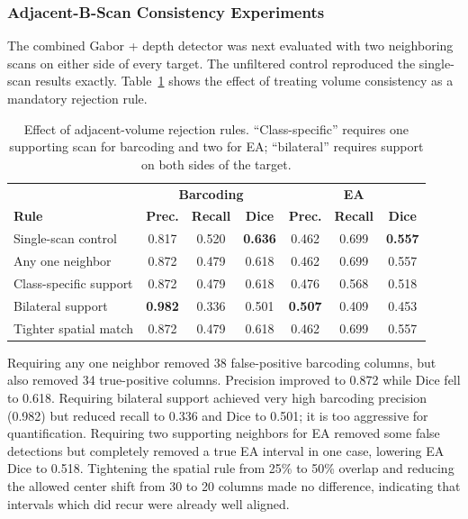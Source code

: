 \documentclass[11pt]{article}
\begin{document}
\subsubsection{Adjacent-B-Scan Consistency Experiments}

The combined Gabor + depth detector was next evaluated with two neighboring
scans on either side of every target.  The unfiltered control reproduced the
single-scan results exactly.  Table~\ref{tab:adjacent_experiments} shows the
effect of treating volume consistency as a mandatory rejection rule.

\begin{table}[H]
\centering
\small
\begin{tabular}{lccc|ccc}
\toprule
& \multicolumn{3}{c|}{\textbf{Barcoding}} &
\multicolumn{3}{c}{\textbf{EA}} \\
\textbf{Rule} & \textbf{Prec.} & \textbf{Recall} & \textbf{Dice} &
\textbf{Prec.} & \textbf{Recall} & \textbf{Dice} \\
\midrule
Single-scan control & 0.817 & 0.520 & \textbf{0.636} & 0.462 & 0.699 & \textbf{0.557} \\
Any one neighbor & 0.872 & 0.479 & 0.618 & 0.462 & 0.699 & 0.557 \\
Class-specific support & 0.872 & 0.479 & 0.618 & 0.476 & 0.568 & 0.518 \\
Bilateral support & \textbf{0.982} & 0.336 & 0.501 & \textbf{0.507} & 0.409 & 0.453 \\
Tighter spatial match & 0.872 & 0.479 & 0.618 & 0.462 & 0.699 & 0.557 \\
\bottomrule
\end{tabular}
\caption{Effect of adjacent-volume rejection rules.  ``Class-specific''
requires one supporting scan for barcoding and two for EA; ``bilateral''
requires support on both sides of the target.}
\label{tab:adjacent_experiments}
\end{table}

Requiring any one neighbor removed 38 false-positive barcoding columns, but
also removed 34 true-positive columns.  Precision improved to 0.872 while Dice
fell to 0.618.  Requiring bilateral support achieved very high barcoding
precision (0.982) but reduced recall to 0.336 and Dice to 0.501; it is too
aggressive for quantification.  Requiring two supporting neighbors for EA
removed some false detections but completely removed a true EA interval in one
case, lowering EA Dice to 0.518.  Tightening the spatial rule from 25\% to
50\% overlap and reducing the allowed center shift from 30 to 20 columns made
no difference, indicating that intervals which did recur were already well
aligned.
\end{document}

